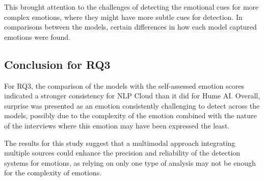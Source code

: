 This brought attention to the challenges of detecting the emotional cues for more complex emotions, where they might have more subtle cues for detection.
In comparisons between the models, certain differences in how each model captured emotions were found.

\subsection{Conclusion for RQ3}
For RQ3, the comparison of the models with the self-assessed emotion scores indicated a stronger consistency for NLP Cloud than it did for Hume AI.
Overall, surprise was presented as an emotion consistently challenging to detect across the models, possibly due to the complexity of the emotion combined with the nature of the interviews where this emotion may have been expressed the least.

The results for this study suggest that a multimodal approach integrating multiple sources could enhance the precision and reliability of the detection systems for emotions, as relying on only one type of analysis may not be enough for the complexity of emotions.
